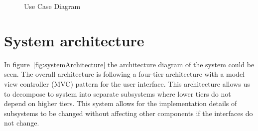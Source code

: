 \begin{figure}
	\caption{Use Case Diagram}
\label{fig:useCase}
\end{figure}

\FloatBarrier
\section{System architecture}
In figure~\ref{fig:systemArchitecture} the architecture diagram of the system could be seen. The overall architecture is following a four-tier architecture with a model view controller (MVC) pattern for the user interface. This architecture allows us to decompose to system into separate subsystems where lower tiers do not depend on higher tiers. This system allows for the implementation details of subsystems to be changed without affecting other components if the interfaces do not change.

